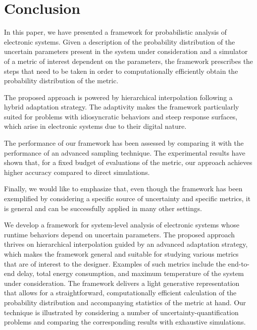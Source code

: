 \section{Conclusion}

In this paper, we have presented a framework for probabilistic analysis of
electronic systems. Given a description of the probability distribution of the
uncertain parameters present in the system under consideration and a simulator
of a metric of interest dependent on the parameters, the framework prescribes
the steps that need to be taken in order to computationally efficiently obtain
the probability distribution of the metric.

The proposed approach is powered by hierarchical interpolation following a
hybrid adaptation strategy. The adaptivity makes the framework particularly
suited for problems with idiosyncratic behaviors and steep response surfaces,
which arise in electronic systems due to their digital nature.

The performance of our framework has been assessed by comparing it with the
performance of an advanced sampling technique. The experimental results have
shown that, for a fixed budget of evaluations of the metric, our approach
achieves higher accuracy compared to direct simulations.

Finally, we would like to emphasize that, even though the framework has been
exemplified by considering a specific source of uncertainty and specific
metrics, it is general and can be successfully applied in many other settings.

We develop a framework for system-level analysis of electronic systems whose
runtime behaviors depend on uncertain parameters. The proposed approach thrives
on hierarchical interpolation guided by an advanced adaptation strategy, which
makes the framework general and suitable for studying various metrics that are
of interest to the designer. Examples of such metrics include the end-to-end
delay, total energy consumption, and maximum temperature of the system under
consideration. The framework delivers a light generative representation that
allows for a straightforward, computationally efficient calculation of the
probability distribution and accompanying statistics of the metric at hand. Our
technique is illustrated by considering a number of uncertainty-quantification
problems and comparing the corresponding results with exhaustive simulations.
